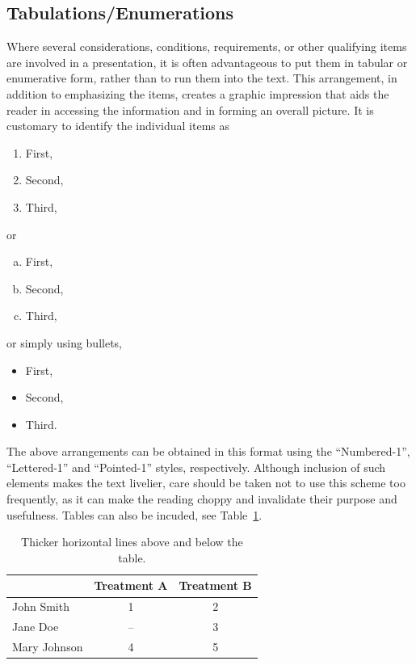 \documentclass[bibtex,pagenumbers]{stabs2021}
\begin{document}
\subsection{Tabulations/Enumerations}

Where several considerations, conditions, requirements, or other qualifying items are involved in a presentation, it is often advantageous to put them in tabular or enumerative form, rather than to run them into the text. This arrangement, in addition to emphasizing the items, creates a graphic impression that aids the reader in accessing the information and in forming an overall picture. It is customary to identify the individual items as
\begin{enumerate}[(1)]
    \item First,
    \item Second,
    \item Third,
\end{enumerate}
or
\begin{enumerate}[(a)]
    \item First,
    \item Second,
    \item Third,
\end{enumerate}
or simply using bullets,
\begin{itemize}
    \item First,
    \item Second,
    \item Third.
\end{itemize}
The above arrangements can be obtained in this format using the ``Numbered-1'', ``Lettered-1'' and ``Pointed-1'' styles, respectively. Although inclusion of such elements makes the text livelier, care should be taken not to use this scheme too frequently, as it can make the reading choppy and invalidate their purpose and usefulness. Tables can also be incuded, see Table~\ref{tbl:example-table}.
\begin{table}[ht]
\centering
\caption{Thicker horizontal lines above and below the table.}
\label{tbl:example-table}
\begin{tabular}[t]{lcc}
\toprule
&Treatment A&Treatment B\\
\midrule
John Smith&1&2\\
Jane Doe&--&3\\
Mary Johnson&4&5\\
\bottomrule
\end{tabular}
\end{table}%
\end{document}
